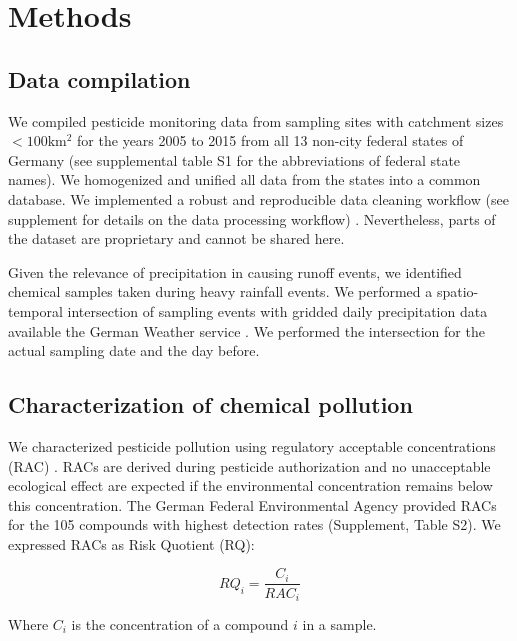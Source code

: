 \documentclass[journal=esthag,manuscript=article]{achemso}
\begin{document}
\section{Methods}
\subsection{Data compilation}
We compiled pesticide monitoring data from sampling sites with catchment sizes $\mathrm{< 100km^2}$ for the years 2005 to 2015 from all 13 non-city federal states of Germany (see supplemental table S1 for the abbreviations of federal state names). 
We homogenized and unified all data from the states into a common database.
We implemented a robust and reproducible data cleaning workflow (see supplement for details on the data processing workflow) \citep{poisot_best_2015}.
Nevertheless, parts of the dataset are proprietary and cannot be shared here.

Given the relevance of precipitation in causing runoff events, we identified chemical samples taken during heavy rainfall events.
We performed a spatio-temporal intersection of sampling events with gridded daily precipitation data available the German Weather service \citep{rauthe_central_2013}. 
We performed the intersection for the actual sampling date and the day before.


\subsection{Characterization of chemical pollution}
We characterized pesticide pollution using regulatory acceptable concentrations (RAC) \citep{brock_linking_2010}.
RACs are derived during pesticide authorization and no unacceptable ecological effect are expected if the environmental concentration remains below this concentration.
The German Federal Environmental Agency provided RACs for the 105 compounds with highest detection rates (Supplement, Table S2). 
We expressed RACs as Risk Quotient (RQ):

\begin{equation}
RQ_i = \frac{C_i}{RAC_i}
\end{equation}

Where $C_i$ is the concentration of a compound $i$ in a sample.
\end{document}
